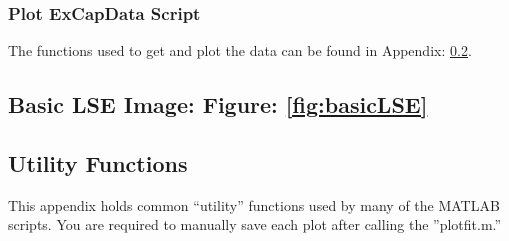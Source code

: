 \subsubsection{Plot ExCapData Script}
The functions used to get and plot the data can be found in Appendix: \ref{app:utilityFuns}.


\subsection{Basic LSE Image: Figure: \ref{fig:basicLSE}}


\subsection{Utility Functions}
\label{app:utilityFuns}
This appendix holds common ``utility'' functions used by many of the MATLAB scripts. You are required to manually save each plot after calling the ''plotfit.m.''





